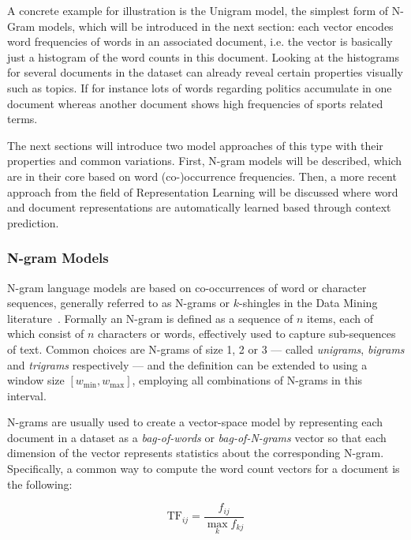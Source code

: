 A concrete example for illustration is the Unigram model, the simplest form of N-Gram models, which will be introduced in the next section: each vector encodes word frequencies of words in an associated document, i.e. the vector is basically just a histogram of the word counts in this document. Looking at the histograms for several documents in the dataset can already reveal certain properties visually such as topics. If for instance lots of words regarding politics accumulate in one document whereas another document shows high frequencies of sports related terms.

The next sections will introduce two model approaches of this type with their properties and common variations. First, N-gram models will be described, which are in their core based on word (co-)occurrence frequencies. Then, a more recent approach from the field of \gls{Representation Learning} will be discussed where word and document representations are automatically learned based through context prediction.

\subsubsection{N-gram Models}
\label{subs:N-gram Models (Methods)}

N-gram language models are based on co-occurrences of word or character sequences, generally referred to as N-grams or $k$-shingles in the Data Mining literature~\cite[Chapter 3.2, p.~72]{Leskovec:2014aa}. Formally an N-gram is defined as a sequence of $n$ items, each of which consist of $n$ characters or words, effectively used to capture sub-sequences of text. Common choices are N-grams of size 1, 2 or 3 --- called \emph{unigrams}, \emph{bigrams} and \emph{trigrams} respectively --- and the definition can be extended to using a window size $[\textit{w}_{\text{min}}, \textit{w}_{\text{max}}]$, employing all combinations of N-grams in this interval.

N-grams are usually used to create a vector-space model by representing each document in a dataset as a \textit{bag-of-words} or \textit{bag-of-N-grams} vector so that each dimension of the vector represents statistics about the corresponding N-gram. Specifically, a common way to compute the word count vectors for a document is the following:

\begin{equation}
  \text{TF}_{ij} = \frac{f_{ij}}{\max_k f_{kj}}
\end{equation}

